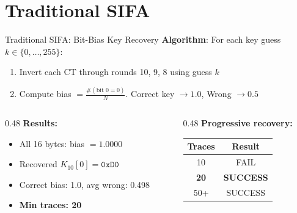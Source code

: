 \documentclass[aspectratio=169]{beamer}
\begin{document}
\section{Traditional SIFA}
\begin{frame}{Traditional SIFA: Bit-Bias Key Recovery}
\textbf{Algorithm}: For each key guess $k \in \{0, \ldots, 255\}$:
\begin{enumerate}
    \item Invert each CT through rounds 10, 9, 8 using guess $k$
    \item Compute bias $= \frac{\#(\text{bit 0}=0)}{N}$. \quad Correct key $\rightarrow 1.0$, \quad Wrong $\rightarrow 0.5$
\end{enumerate}

\vspace{0.2cm}
\begin{columns}[T]
\begin{column}{0.48\textwidth}
\textbf{Results:}
\begin{itemize}
    \item All 16 bytes: bias $= 1.0000$
    \item Recovered $K_{10}[0] = \texttt{0xD0}$ \checkmark
    \item Correct bias: 1.0, avg wrong: 0.498
    \item \textbf{Min traces: 20}
\end{itemize}
\end{column}
\begin{column}{0.48\textwidth}
\centering
\small \textbf{Progressive recovery:}
\vspace{0.1cm}

\begin{tabular}{cc}
\toprule
\textbf{Traces} & \textbf{Result} \\
\midrule
10 & FAIL \\
\textbf{20} & \textbf{SUCCESS} \\
50+ & SUCCESS \\
\bottomrule
\end{tabular}
\end{column}
\end{columns}
\end{frame}
\end{document}
